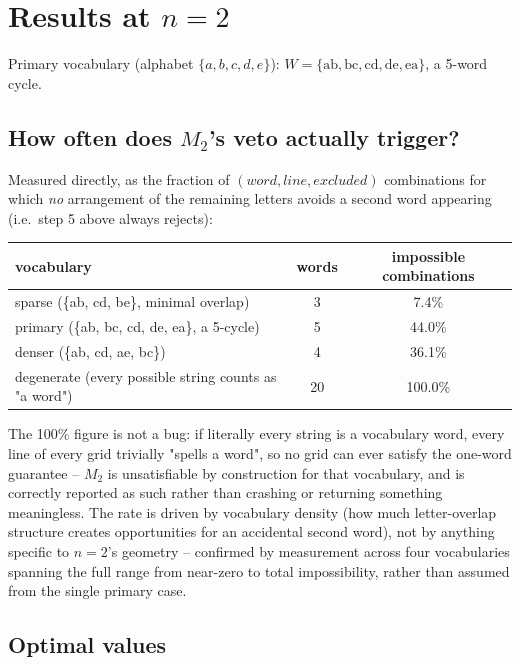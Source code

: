\documentclass[11pt]{article}
\begin{document}
\section{Results at $n=2$}
\label{sec:n2}

Primary vocabulary (alphabet $\{a,b,c,d,e\}$): $W = \{\mathrm{ab, bc, cd,
de, ea}\}$, a 5-word cycle.

\subsection{How often does $M_2$'s veto actually trigger?}

Measured directly, as the fraction of $(word, line, excluded)$
combinations for which \emph{no} arrangement of the remaining letters
avoids a second word appearing (i.e.\ step 5 above always rejects):

\begin{center}
\begin{tabular}{lcc}
\toprule
vocabulary & words & impossible combinations \\
\midrule
sparse (\{ab, cd, be\}, minimal overlap) & 3 & 7.4\% \\
primary (\{ab, bc, cd, de, ea\}, a 5-cycle) & 5 & 44.0\% \\
denser (\{ab, cd, ae, bc\}) & 4 & 36.1\% \\
degenerate (every possible string counts as "a word") & 20 & 100.0\% \\
\bottomrule
\end{tabular}
\end{center}

The 100\% figure is not a bug: if literally every string is a vocabulary
word, every line of every grid trivially "spells a word", so no grid can
ever satisfy the one-word guarantee -- $M_2$ is unsatisfiable by
construction for that vocabulary, and is correctly reported as such
rather than crashing or returning something meaningless. The rate is
driven by vocabulary density (how much letter-overlap structure creates
opportunities for an accidental second word), not by anything specific to
$n=2$'s geometry -- confirmed by measurement across four vocabularies
spanning the full range from near-zero to total impossibility, rather
than assumed from the single primary case.

\subsection{Optimal values}
\end{document}
